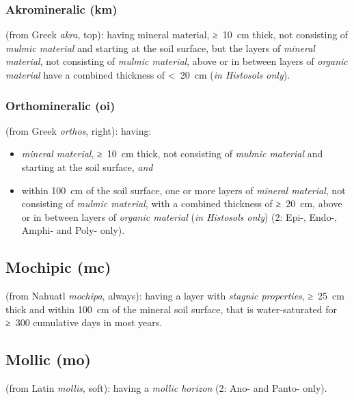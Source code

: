 \documentclass[
  letterpaper,
  DIV=11,
  numbers=noendperiod]{scrreprt}
\providecommand{\tightlist}{%
  \setlength{\itemsep}{0pt}\setlength{\parskip}{0pt}}\usepackage{longtable,booktabs,array}
\begin{document}
\hypertarget{akromineralic-km}{%
\subsubsection{Akromineralic (km)}\label{akromineralic-km}}

(from Greek \emph{akra}, top): having mineral material, ≥~10~cm thick,
not consisting of \emph{mulmic material} and starting at the soil
surface, but the layers of \emph{mineral material}, not consisting of
\emph{mulmic material}, above or in between layers of \emph{organic
material} have a combined thickness of \textless~20~cm (\emph{in
Histosols only}).

\hypertarget{orthomineralic-oi}{%
\subsubsection{Orthomineralic (oi)}\label{orthomineralic-oi}}

(from Greek \emph{orthos}, right): having:

\begin{itemize}
\tightlist
\item
  \emph{mineral material}, ≥~10~cm thick, not consisting of \emph{mulmic
  material} and starting at the soil surface, \emph{and}
\item
  within 100~cm of the soil surface, one or more layers of \emph{mineral
  material}, not consisting of \emph{mulmic material}, with a combined
  thickness of ≥~20~cm, above or in between layers of \emph{organic
  material} (\emph{in Histosols only}) (2: Epi-, Endo-, Amphi- and Poly-
  only).
\end{itemize}

\hypertarget{mochipic-mc}{%
\subsection{Mochipic (mc)}\label{mochipic-mc}}

(from Nahuatl \emph{mochipa}, always): having a layer with \emph{stagnic
properties}, ≥~25~cm thick and within 100~cm of the mineral soil
surface, that is water-saturated for ≥~300 cumulative days in most
years.

\hypertarget{mollic-mo}{%
\subsection{Mollic (mo)}\label{mollic-mo}}

(from Latin \emph{mollis}, soft): having a \emph{mollic horizon} (2:
Ano- and Panto- only).
\end{document}
